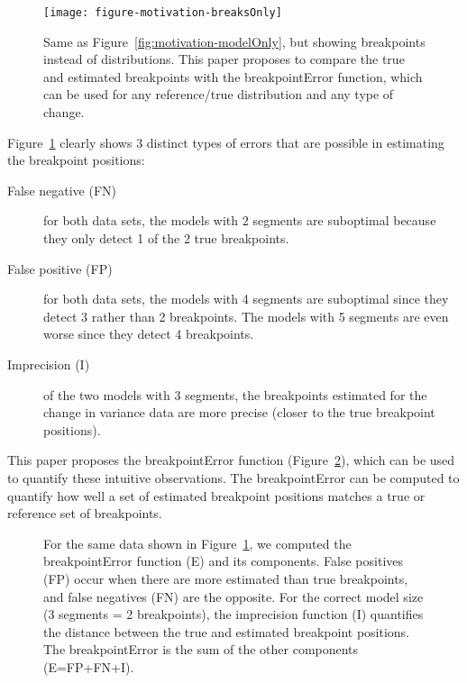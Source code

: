 \documentclass{jsfds} %
\begin{document}
\begin{figure}[H]
  \centering
  \texttt{[image: figure-motivation-breaksOnly]}
  \vskip -0.5cm
  \caption{Same as Figure~\ref{fig:motivation-modelOnly}, but showing
    breakpoints instead of distributions. This paper proposes to
    compare the true and estimated breakpoints with the
    breakpointError function, which can be used for any reference/true
    distribution and any type of change. }
  \label{fig:motivation-breaksOnly}
\end{figure}

\newpage

Figure~\ref{fig:motivation-breaksOnly} clearly shows 3 distinct types
of errors that are possible in estimating the breakpoint positions:
\begin{description}
\item[False negative (FN)] for both data sets, the models with 2
segments are suboptimal because they only detect 1 of the 2 true
breakpoints.
\item[False positive (FP)] for both data sets, the models with 4
  segments are suboptimal since they detect 3 rather than 2
  breakpoints. The models with 5 segments are even worse since they
  detect 4 breakpoints.
\item[Imprecision (I)] of the two models with 3 segments, the
  breakpoints estimated for the change in variance data are more
  precise (closer to the true breakpoint positions).
\end{description}

This paper proposes the breakpointError function
(Figure~\ref{fig:motivation-breakpointError}), which can be used to
quantify these intuitive observations. The breakpointError can be
computed to quantify how well a set of estimated breakpoint positions
matches a true or reference set of breakpoints.


\begin{figure}[H]
  \centering
  
  \vskip -0.7cm
  \caption{For the same data shown in
    Figure~\ref{fig:motivation-breaksOnly}, we computed the
    breakpointError function (E) and its components. False positives
    (FP) occur when there are more estimated than true breakpoints,
    and false negatives (FN) are the opposite. For the correct model
    size (3 segments = 2 breakpoints), the imprecision function (I)
    quantifies the distance between the true and estimated breakpoint
    positions. The breakpointError is the sum of the other components
    (E=FP+FN+I).}
  \label{fig:motivation-breakpointError}
\end{figure}
\end{document}
